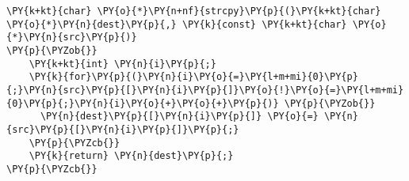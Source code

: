 \begin{Verbatim}[commandchars=\\\{\}]
\PY{k+kt}{char} \PY{o}{*}\PY{n+nf}{strcpy}\PY{p}{(}\PY{k+kt}{char} \PY{o}{*}\PY{n}{dest}\PY{p}{,} \PY{k}{const} \PY{k+kt}{char} \PY{o}{*}\PY{n}{src}\PY{p}{)}
\PY{p}{\PYZob{}}
    \PY{k+kt}{int} \PY{n}{i}\PY{p}{;}
    \PY{k}{for}\PY{p}{(}\PY{n}{i}\PY{o}{=}\PY{l+m+mi}{0}\PY{p}{;}\PY{n}{src}\PY{p}{[}\PY{n}{i}\PY{p}{]}\PY{o}{!}\PY{o}{=}\PY{l+m+mi}{0}\PY{p}{;}\PY{n}{i}\PY{o}{+}\PY{o}{+}\PY{p}{)} \PY{p}{\PYZob{}}
      \PY{n}{dest}\PY{p}{[}\PY{n}{i}\PY{p}{]} \PY{o}{=} \PY{n}{src}\PY{p}{[}\PY{n}{i}\PY{p}{]}\PY{p}{;}
    \PY{p}{\PYZcb{}}
    \PY{k}{return} \PY{n}{dest}\PY{p}{;}
\PY{p}{\PYZcb{}}
\end{Verbatim}

